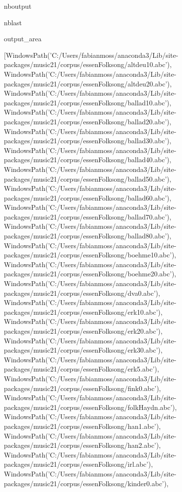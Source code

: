 \documentclass[letterpaper,10pt,english]{sphinxmanual}
\begin{document}
\begin{sphinxuseclass}{nboutput}
\begin{sphinxuseclass}{nblast}
{\begin{sphinxuseclass}{output_area}
\begin{sphinxuseclass}{}
\begin{sphinxVerbatim}[commandchars=\\\{\}]
\llap{\color{nbsphinxout}[5]:\,\hspace{\fboxrule}\hspace{\fboxsep}}[WindowsPath('C:/Users/fabianmoss/anaconda3/Lib/site-packages/music21/corpus/essenFolksong/altdeu10.abc'),
 WindowsPath('C:/Users/fabianmoss/anaconda3/Lib/site-packages/music21/corpus/essenFolksong/altdeu20.abc'),
 WindowsPath('C:/Users/fabianmoss/anaconda3/Lib/site-packages/music21/corpus/essenFolksong/ballad10.abc'),
 WindowsPath('C:/Users/fabianmoss/anaconda3/Lib/site-packages/music21/corpus/essenFolksong/ballad20.abc'),
 WindowsPath('C:/Users/fabianmoss/anaconda3/Lib/site-packages/music21/corpus/essenFolksong/ballad30.abc'),
 WindowsPath('C:/Users/fabianmoss/anaconda3/Lib/site-packages/music21/corpus/essenFolksong/ballad40.abc'),
 WindowsPath('C:/Users/fabianmoss/anaconda3/Lib/site-packages/music21/corpus/essenFolksong/ballad50.abc'),
 WindowsPath('C:/Users/fabianmoss/anaconda3/Lib/site-packages/music21/corpus/essenFolksong/ballad60.abc'),
 WindowsPath('C:/Users/fabianmoss/anaconda3/Lib/site-packages/music21/corpus/essenFolksong/ballad70.abc'),
 WindowsPath('C:/Users/fabianmoss/anaconda3/Lib/site-packages/music21/corpus/essenFolksong/ballad80.abc'),
 WindowsPath('C:/Users/fabianmoss/anaconda3/Lib/site-packages/music21/corpus/essenFolksong/boehme10.abc'),
 WindowsPath('C:/Users/fabianmoss/anaconda3/Lib/site-packages/music21/corpus/essenFolksong/boehme20.abc'),
 WindowsPath('C:/Users/fabianmoss/anaconda3/Lib/site-packages/music21/corpus/essenFolksong/dva0.abc'),
 WindowsPath('C:/Users/fabianmoss/anaconda3/Lib/site-packages/music21/corpus/essenFolksong/erk10.abc'),
 WindowsPath('C:/Users/fabianmoss/anaconda3/Lib/site-packages/music21/corpus/essenFolksong/erk20.abc'),
 WindowsPath('C:/Users/fabianmoss/anaconda3/Lib/site-packages/music21/corpus/essenFolksong/erk30.abc'),
 WindowsPath('C:/Users/fabianmoss/anaconda3/Lib/site-packages/music21/corpus/essenFolksong/erk5.abc'),
 WindowsPath('C:/Users/fabianmoss/anaconda3/Lib/site-packages/music21/corpus/essenFolksong/fink0.abc'),
 WindowsPath('C:/Users/fabianmoss/anaconda3/Lib/site-packages/music21/corpus/essenFolksong/folkHaydn.abc'),
 WindowsPath('C:/Users/fabianmoss/anaconda3/Lib/site-packages/music21/corpus/essenFolksong/han1.abc'),
 WindowsPath('C:/Users/fabianmoss/anaconda3/Lib/site-packages/music21/corpus/essenFolksong/han2.abc'),
 WindowsPath('C:/Users/fabianmoss/anaconda3/Lib/site-packages/music21/corpus/essenFolksong/irl.abc'),
 WindowsPath('C:/Users/fabianmoss/anaconda3/Lib/site-packages/music21/corpus/essenFolksong/kinder0.abc'),

\end{sphinxVerbatim}
\end{sphinxuseclass}
\end{sphinxuseclass}}
\end{sphinxuseclass}
\end{sphinxuseclass}
\end{document}
